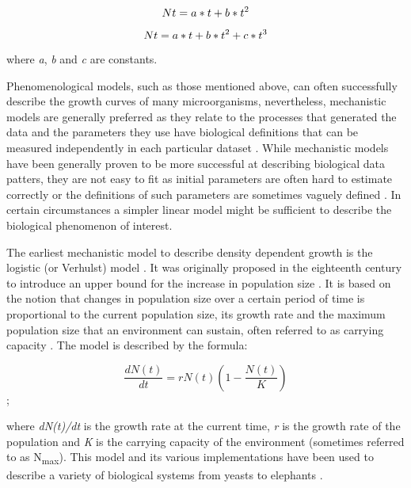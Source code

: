 \documentclass[a4paper]{article}
\begin{document}
\begin{equation}
\label{eqn:quadratic} 
Nt= a*t + b* t\textsuperscript{2}  
\end{equation}

\begin{equation}
\label{eqn:cubic}
Nt = a*t + b* t\textsuperscript{2} + c*t\textsuperscript{3} \end{equation}

where \textit{a}, \textit{b} and \textit{c} are constants.\par

Phenomenological models, such as those mentioned above, can often successfully describe the growth curves of many microorganisms, nevertheless, mechanistic models are generally preferred as they relate to the processes that generated the data and the parameters they use have biological definitions that can be measured independently in each particular dataset \citep{liberles2013need}. While mechanistic models have been generally proven to be more successful at describing biological data patters, they are not easy to fit as initial parameters are often hard to estimate correctly or the definitions of such parameters are sometimes vaguely defined \citep{levins1966strategy}. In certain circumstances a simpler linear model might be sufficient to describe the biological phenomenon of interest. \par

The earliest mechanistic model to describe density dependent growth is the logistic (or Verhulst) model \citep{verhulst1838notice}. It was originally proposed in the eighteenth century to introduce an upper bound for the increase in population size \citep{TSOULARIS200221}. It is based on the notion that changes in population size over a certain period of time is proportional to the current population size, its growth rate and the maximum population size that an environment can sustain, often referred to as carrying capacity \citep{PELEG2007808}. The model is described by the formula: 

\begin{equation}
\label{eqn:logistic}
\frac{dN(t)}{dt} = rN(t) \left( 1- \frac{N(t)}{K} \right) 
\end{equation}; 

where \textit{dN(t)/dt} is the growth rate at the current time, \textit{r} is the growth rate of the population and \textit{K} is the carrying capacity of the environment (sometimes referred to as N\textsubscript{max}). This model and its various implementations have been used to describe a variety of biological systems from yeasts \citep{carlson1913geschwindigkeit} to elephants \citep{morgan1976stochastic} \citep{TSOULARIS200221}. \par
\end{document}
